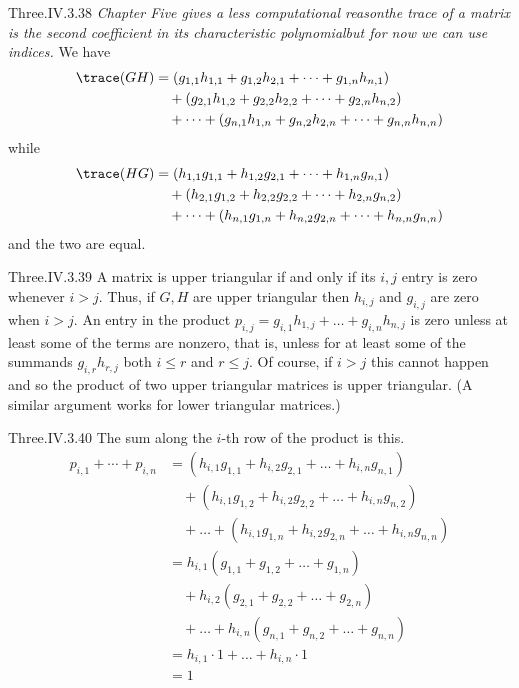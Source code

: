 \begin{ans}{Three.IV.3.38}
     \textit{Chapter Five gives a less computational reason\Dash the
     trace of a matrix is the second coefficient in its characteristic
     polynomial\Dash but for now we can use indices.}
     We have
     \begin{align*}
       \trace (GH)
       &=(g_{1,1}h_{1,1}+g_{1,2}h_{2,1}+\dots+g_{1,n}h_{n,1})  \\
       &\text{}\quad+(g_{2,1}h_{1,2}+g_{2,2}h_{2,2}+\dots+g_{2,n}h_{n,2}) \\
       &\text{}\quad
        +\cdots+(g_{n,1}h_{1,n}+g_{n,2}h_{2,n}+\dots+g_{n,n}h_{n,n})
     \end{align*}
     while
     \begin{align*}
       \trace (HG)
       &=(h_{1,1}g_{1,1}+h_{1,2}g_{2,1}+\dots+h_{1,n}g_{n,1})  \\
       &\text{}\quad+(h_{2,1}g_{1,2}+h_{2,2}g_{2,2}+\dots+h_{2,n}g_{n,2}) \\
       &\text{}\quad
         +\cdots+(h_{n,1}g_{1,n}+h_{n,2}g_{2,n}+\dots+h_{n,n}g_{n,n})
     \end{align*}
     and the two are equal.
    
\end{ans}
\begin{ans}{Three.IV.3.39}
      A matrix is upper triangular if and only if its $i,j$ entry is zero
      whenever \( i>j \).
      Thus, if \( G,H \) are upper triangular then \( h_{i,j} \) and
      \( g_{i,j} \) are zero when \( i>j \).
      An entry in the product
      \( p_{i,j}=g_{i,1}h_{1,j}+\dots+g_{i,n}h_{n,j} \)
      is zero unless at least some of the terms are nonzero, that is, unless
      for at least some of the summands
      \( g_{i,r}h_{r,j} \) both \( i\leq r \) and \( r\leq j \).
      Of course, if \( i>j \) this cannot happen and so the product of two
      upper triangular matrices is upper triangular.
      (A similar argument works for lower triangular matrices.)
   
\end{ans}
\begin{ans}{Three.IV.3.40}
     The sum along the \( i \)-th row of the product is this.
     \begin{align*}
       p_{i,1}+\cdots+p_{i,n}
       &=(h_{i,1}g_{1,1}+h_{i,2}g_{2,1}+\dots+h_{i,n}g_{n,1})  \\
       &\text{}\quad+(h_{i,1}g_{1,2}+h_{i,2}g_{2,2}+\dots+h_{i,n}g_{n,2}) \\
       &\text{}\quad
        +\dots+(h_{i,1}g_{1,n}+h_{i,2}g_{2,n}+\dots+h_{i,n}g_{n,n})  \\
       &=h_{i,1}(g_{1,1}+g_{1,2}+\dots+g_{1,n})  \\
       &\text{}\quad+h_{i,2}(g_{2,1}+g_{2,2}+\dots+g_{2,n}) \\
       &\text{}\quad
        +\dots+h_{i,n}(g_{n,1}+g_{n,2}+\dots+g_{n,n})  \\
       &=h_{i,1}\cdot 1+\dots+h_{i,n}\cdot 1  \\
       &=1
     \end{align*}
    
\end{ans}
